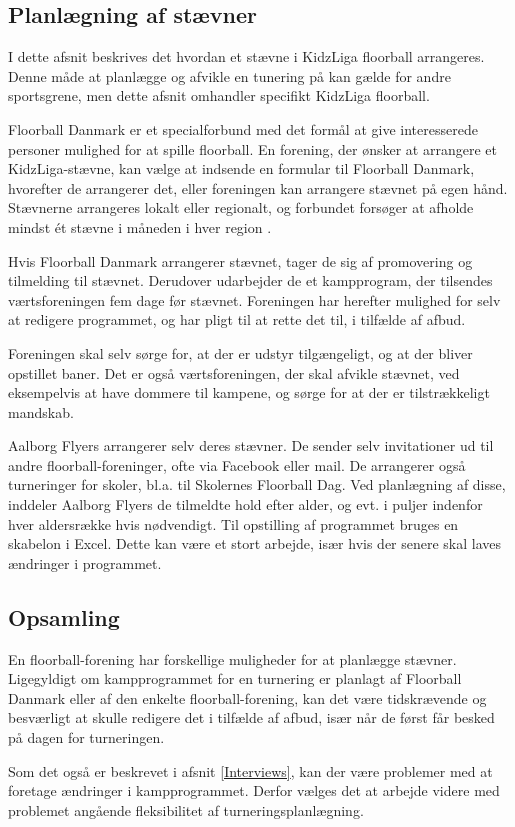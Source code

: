 \subsection{Planlægning af stævner}
I dette afsnit beskrives det hvordan et stævne i KidzLiga floorball arrangeres. Denne måde at planlægge og afvikle en tunering på kan gælde for andre sportsgrene, men dette afsnit omhandler specifikt KidzLiga floorball.
\par
Floorball Danmark er et specialforbund med det formål at give interesserede personer mulighed for at spille floorball. En forening, der ønsker at arrangere et KidzLiga-stævne, kan vælge at indsende en formular til Floorball Danmark, hvorefter de arrangerer det, eller foreningen kan arrangere stævnet på egen hånd. Stævnerne arrangeres lokalt eller regionalt, og forbundet forsøger at afholde mindst ét stævne i måneden i hver region \citep{kidzRegler}.
\par
Hvis Floorball Danmark arrangerer stævnet, tager de sig af promovering og tilmelding til stævnet. Derudover udarbejder de et kampprogram, der tilsendes værtsforeningen fem dage før stævnet. Foreningen har herefter mulighed for selv at redigere programmet, og har pligt til at rette det til, i tilfælde af afbud.
\par
Foreningen skal selv sørge for, at der er udstyr tilgængeligt, og at der bliver opstillet baner. Det er også værtsforeningen, der skal afvikle stævnet, ved eksempelvis at have dommere til kampene, og sørge for at der er tilstrækkeligt mandskab\citep{kidzRegler}. 
\par
Aalborg Flyers arrangerer selv deres stævner. De sender selv invitationer ud til andre floorball-foreninger, ofte via Facebook eller mail. De arrangerer også turneringer for skoler, bl.a. til Skolernes Floorball Dag. Ved planlægning af disse, inddeler Aalborg Flyers de tilmeldte hold efter alder, og evt. i puljer indenfor hver aldersrække hvis nødvendigt. Til opstilling af programmet bruges en skabelon i Excel. Dette kan være et stort arbejde, især hvis der senere skal laves ændringer i programmet.

\subsection*{Opsamling} 
En floorball-forening har forskellige muligheder for at planlægge stævner. Ligegyldigt om kampprogrammet for en turnering er planlagt af Floorball Danmark eller af den enkelte floorball-forening, kan det være tidskrævende og besværligt at skulle redigere det i tilfælde af afbud, især når de først får besked på dagen for turneringen.
\par
Som det også er beskrevet i afsnit \ref{Interviews}, kan der være problemer med at foretage ændringer i kampprogrammet. Derfor vælges det at arbejde videre med problemet angående fleksibilitet af turneringsplanlægning.

